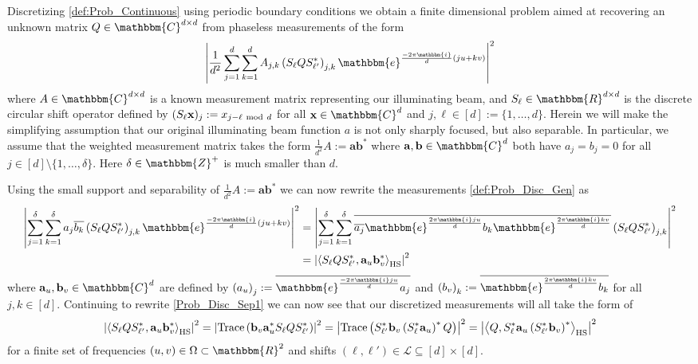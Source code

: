 \documentclass[]{spie}  %
\def \a {\mathbf a}
\def \b {\mathbf b}
\def \x {\mathbf x}
\def \HS {\rm HS}
\def \e { \mathbbm{e}}
\def \i { \mathbbm{i}}
\begin{document}
Discretizing \eqref{def:Prob_Continuous} using periodic boundary conditions we obtain a finite dimensional problem aimed at recovering an unknown matrix $Q \in \mathbbm{C}^{d \times d}$ from phaseless measurements of the form
\begin{equation}
\left| \frac{1}{d^2} \sum^d_{j=1} \sum^d_{k=1} A_{j,k} \left(S_{\ell}QS^*_{\ell'}\right)_{j,k} \e^{\frac{-2\pi \i}{d}(ju + kv)} \right|^2
\label{def:Prob_Disc_Gen}
\end{equation}
where $A \in \mathbbm{C}^{d \times d}$ is a known measurement matrix representing our illuminating beam, and $S_\ell \in \mathbbm{R}^{d \times d}$ is the discrete circular shift operator defined by $(S_\ell \x)_j := x_{j-\ell ~{\rm mod}~ d}$ for all $\x \in \mathbbm{C}^d$ and $j,\ell \in [d] := \{ 1, \dots, d\}$.  Herein we will make the simplifying assumption that our original illuminating beam function $a$ is not only sharply focused, but also separable.  In particular, we assume that the weighted measurement matrix takes the form $\frac{1}{d^2} A := \a \b^*$ where $\a,\b \in \mathbbm{C}^d$ both have $a_j = b_j = 0$ for all $j \in [d] \setminus \{ 1, \dots, \delta \}$.  Here $\delta \in \mathbbm{Z}^+$ is much smaller than $d$.

Using the small support and separability of $\frac{1}{d^2} A := \a \b^*$ we can now rewrite the measurements \eqref{def:Prob_Disc_Gen} as
\begin{align}
\left| \sum^\delta_{j=1} \sum^\delta_{k=1} a_j \overline{b_k} \left(S_{\ell}QS^*_{\ell'}\right)_{j,k} \e^{\frac{-2\pi \i}{d}(ju + kv)} \right|^2 &= \left| \sum^\delta_{j=1} \sum^\delta_{k=1} \overline{\overline{a_j}\e^{\frac{2 \pi \i j u}{d}}  b_k \e^{\frac{2 \pi \i k v}{d}}} \left(S_{\ell}QS^*_{\ell'}\right)_{j,k} \right|^2 \nonumber \\
&= \left| \left\langle S_{\ell}QS^*_{\ell'}, \a_u \b^*_v \right\rangle_{\HS} \right|^2
\label{Prob_Disc_Sep1}
\end{align}
where $\a_u, \b_v \in \mathbbm{C}^d$ are defined by $\left( a_u \right)_j := \overline{\e^{\frac{-2 \pi \i j u}{d}} a_j}$ and $\left( b_v \right)_k := \overline{\e^{\frac{2 \pi \i k v}{d}} b_k}$ for all $j,k \in [d]$.  Continuing to rewrite \eqref{Prob_Disc_Sep1} we can now see that our discretized measurements will all take the form of 
\begin{equation}
\left| \left\langle S_{\ell}QS^*_{\ell'}, \a_u \b^*_v \right\rangle_{\HS} \right|^2 = \left| {\rm Trace}\left( \b_v \a^*_u S_{\ell}QS^*_{\ell'} \right) \right|^2 = \left| {\rm Trace}\left( S^*_{\ell'} \b_v  \left(S^*_{\ell} \a_u \right)^*Q \right) \right|^2 = \left| \left\langle Q, S^*_{\ell} \a_u \left(S^*_{\ell'} \b_v \right)^* \right\rangle_{\HS} \right|^2
\label{Prob_Disc}
\end{equation}
for a finite set of frequencies $(u,v) \in \Omega \subset \mathbbm{R}^2$ and shifts $(\ell,\ell') \in \mathcal{L} \subseteq [d] \times [d]$.
\end{document}
